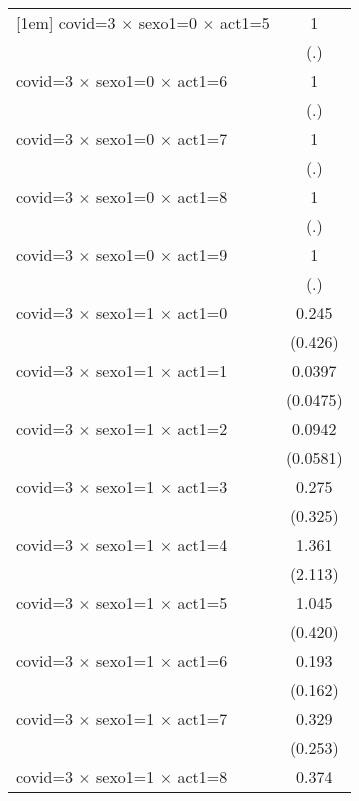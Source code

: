 {\begin{tabular}{l*{1}{c}}
[1em]
covid=3 $\times$ sexo1=0 $\times$ act1=5&           1         \\
                    &         (.)         \\
[1em]
covid=3 $\times$ sexo1=0 $\times$ act1=6&           1         \\
                    &         (.)         \\
[1em]
covid=3 $\times$ sexo1=0 $\times$ act1=7&           1         \\
                    &         (.)         \\
[1em]
covid=3 $\times$ sexo1=0 $\times$ act1=8&           1         \\
                    &         (.)         \\
[1em]
covid=3 $\times$ sexo1=0 $\times$ act1=9&           1         \\
                    &         (.)         \\
[1em]
covid=3 $\times$ sexo1=1 $\times$ act1=0&       0.245         \\
                    &     (0.426)         \\
[1em]
covid=3 $\times$ sexo1=1 $\times$ act1=1&      0.0397\sym{**} \\
                    &    (0.0475)         \\
[1em]
covid=3 $\times$ sexo1=1 $\times$ act1=2&      0.0942\sym{***}\\
                    &    (0.0581)         \\
[1em]
covid=3 $\times$ sexo1=1 $\times$ act1=3&       0.275         \\
                    &     (0.325)         \\
[1em]
covid=3 $\times$ sexo1=1 $\times$ act1=4&       1.361         \\
                    &     (2.113)         \\
[1em]
covid=3 $\times$ sexo1=1 $\times$ act1=5&       1.045         \\
                    &     (0.420)         \\
[1em]
covid=3 $\times$ sexo1=1 $\times$ act1=6&       0.193\sym{*}  \\
                    &     (0.162)         \\
[1em]
covid=3 $\times$ sexo1=1 $\times$ act1=7&       0.329         \\
                    &     (0.253)         \\
[1em]
covid=3 $\times$ sexo1=1 $\times$ act1=8&       0.374\sym{***}\\

\end{tabular}}
